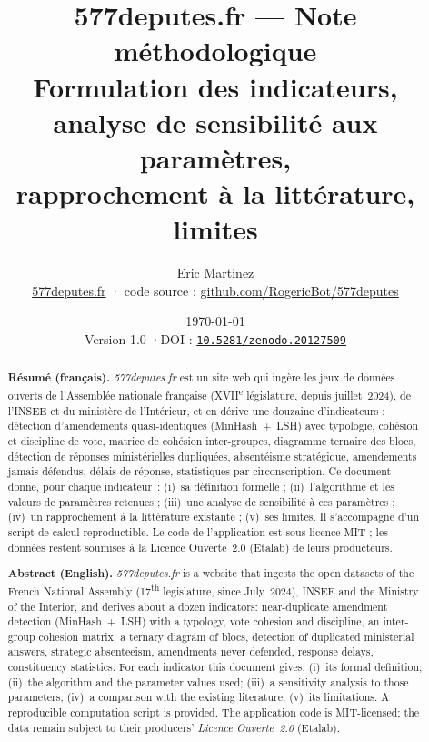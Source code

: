 \documentclass[11pt,a4paper]{article}
\title{\bfseries 577deputes.fr — Note méthodologique\\[4pt]
\large Formulation des indicateurs, analyse de sensibilité aux paramètres,\\
rapprochement à la littérature, limites}
\author{Eric Martinez\\\small \href{https://577deputes.fr}{577deputes.fr} ·
code source : \href{https://github.com/RogericBot/577deputes}{github.com/RogericBot/577deputes}}
\date{\today\\[2pt]\small Version 1.0 \quad·\quad DOI :
\href{https://doi.org/10.5281/zenodo.20127509}{\texttt{10.5281/zenodo.20127509}}}
\begin{document}
\maketitle
\thispagestyle{empty}

\begin{abstract}
\noindent\textbf{Résumé (français).} \emph{577deputes.fr} est un site web qui
ingère les jeux de données ouverts de l'Assemblée nationale française (XVII\textsuperscript{e}
législature, depuis juillet~2024), de l'INSEE et du ministère de l'Intérieur, et
en dérive une douzaine d'indicateurs : détection d'amendements quasi-identiques
(MinHash~+~LSH) avec typologie, cohésion et discipline de vote, matrice de
cohésion inter-groupes, diagramme ternaire des blocs, détection de réponses
ministérielles dupliquées, absentéisme stratégique, amendements jamais défendus,
délais de réponse, statistiques par circonscription. Ce document donne, pour
chaque indicateur~: (i)~sa définition formelle ; (ii)~l'algorithme et les valeurs
de paramètres retenues ; (iii)~une analyse de sensibilité à ces paramètres ;
(iv)~un rapprochement à la littérature existante ; (v)~ses limites. Il s'accompagne
d'un script de calcul reproductible. Le code de l'application est sous licence MIT ;
les données restent soumises à la Licence Ouverte~2.0 (Etalab) de leurs producteurs.

\medskip\noindent\textbf{Abstract (English).} \emph{577deputes.fr} is a website
that ingests the open datasets of the French National Assembly (17\textsuperscript{th}
legislature, since July~2024), INSEE and the Ministry of the Interior, and derives
about a dozen indicators: near-duplicate amendment detection (MinHash~+~LSH) with a
typology, vote cohesion and discipline, an inter-group cohesion matrix, a ternary
diagram of blocs, detection of duplicated ministerial answers, strategic absenteeism,
amendments never defended, response delays, constituency statistics. For each
indicator this document gives: (i)~its formal definition; (ii)~the algorithm and
the parameter values used; (iii)~a sensitivity analysis to those parameters;
(iv)~a comparison with the existing literature; (v)~its limitations. A reproducible
computation script is provided. The application code is MIT-licensed; the data
remain subject to their producers' \emph{Licence Ouverte~2.0} (Etalab).


\end{abstract}
\end{document}
